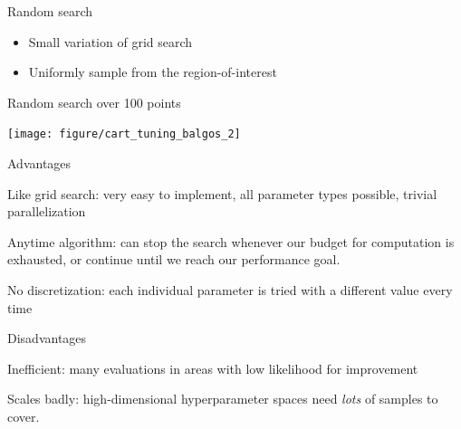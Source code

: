 \documentclass[11pt,compress,t,notes=noshow, xcolor=table]{beamer}
\newenvironment{knitrout}{}{} %
\begin{document}
\begin{vbframe}{Random search}

\begin{itemize}
\item Small variation of grid search
\item Uniformly sample from the region-of-interest
\end{itemize}


\begin{footnotesize}
\begin{center}
Random search over 100 points
\end{center}
\end{footnotesize}

\begin{knitrout}\scriptsize
{}\color{fgcolor}

{\centering \texttt{[image: figure/cart\_tuning\_balgos\_2]} 

}



\end{knitrout}

\framebreak

\begin{blocki}{Advantages}
\item Like grid search: very easy to implement, all parameter types possible, trivial parallelization
\item Anytime algorithm: can stop the search whenever our budget for computation is exhausted, or continue until we reach our performance goal.
\item No discretization: each individual parameter is tried with a different value every time
\end{blocki}
\vspace{-2ex}
\begin{blocki}{Disadvantages}
\item Inefficient: many evaluations in areas with low likelihood for improvement
\item Scales badly: high-dimensional hyperparameter spaces need \emph{lots} of samples to cover.
\end{blocki}
\end{vbframe}
\end{document}
